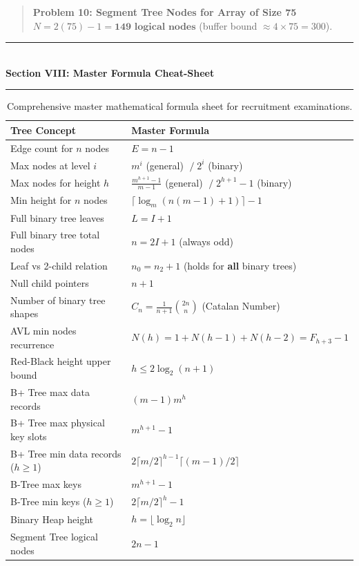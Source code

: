 \begin{quote}
\textbf{Problem 10: Segment Tree Nodes for Array of Size 75}\\
$N = 2(75) - 1 = \mathbf{149 \text{ logical nodes}}$ (buffer bound $\approx 4 \times 75 = 300$).
\end{quote}

\begin{center}
\vspace{1em}
{\color{primary}\rule{0.45\textwidth}{1.2pt}}\\[4pt]
{\Large\bfseries\color{primary} Section VIII: Master Formula Cheat-Sheet}\\[2pt]
{\color{primary}\rule{0.45\textwidth}{1.2pt}}
\vspace{0.5em}
\end{center}

\begin{table}[htbp]
\centering
\small
\begin{tabularx}{\textwidth}{l X}
\toprule
\textbf{Tree Concept} & \textbf{Master Formula} \\
\midrule
Edge count for $n$ nodes & $E = n - 1$ \\
Max nodes at level $i$ & $m^i$ (general) $\;/\; 2^i$ (binary) \\
Max nodes for height $h$ & $\frac{m^{h+1}-1}{m-1}$ (general) $\;/\; 2^{h+1}-1$ (binary) \\
Min height for $n$ nodes & $\lceil \log_m(n(m-1)+1) \rceil - 1$ \\
Full binary tree leaves & $L = I + 1$ \\
Full binary tree total nodes & $n = 2I + 1$ (always odd) \\
Leaf vs 2-child relation & $n_0 = n_2 + 1$ (holds for \textbf{all} binary trees) \\
Null child pointers & $n + 1$ \\
Number of binary tree shapes & $C_n = \frac{1}{n+1} \binom{2n}{n}$ (Catalan Number) \\
AVL min nodes recurrence & $N(h) = 1 + N(h-1) + N(h-2) = F_{h+3}-1$ \\
Red-Black height upper bound & $h \leq 2 \log_2(n+1)$ \\
B+ Tree max data records & $(m - 1) m^h$ \\
B+ Tree max physical key slots & $m^{h+1} - 1$ \\
B+ Tree min data records ($h \geq 1$) & $2 \lceil m/2 \rceil^{h-1} \lceil (m-1)/2 \rceil$ \\
B-Tree max keys & $m^{h+1} - 1$ \\
B-Tree min keys ($h \geq 1$) & $2 \lceil m/2 \rceil^h - 1$ \\
Binary Heap height & $h = \lfloor \log_2 n \rfloor$ \\
Segment Tree logical nodes & $2n - 1$ \\
\bottomrule
\end{tabularx}
\caption{Comprehensive master mathematical formula sheet for recruitment examinations.}
\end{table}

